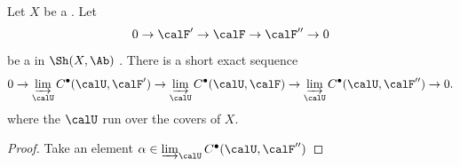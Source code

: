 \begin{lemma}  \label{lemma:short_exact_sequence_of_sheaves_of_abelian_groups_on_a_topological_space_yields_short_exact_sequence_of_colimits_of_cech_complexes}
    Let $X$ be a . Let 
    $$0 \to \calF' \to \calF \to \calF'' \to 0$$
    be a  in $\Sh(X, \Ab)$ . 
    There is a short exact sequence
    $$0 \to \varinjlim_{\calU} C^\bullet(\calU, \calF') \to \varinjlim_{\calU} C^\bullet(\calU, \calF) \to \varinjlim_{\calU} C^\bullet(\calU, \calF'') \to 0.$$
    where the $\calU$ run over the  covers of $X$. 
\end{lemma}
\begin{proof}
    \TODO{}
    Take an element $\alpha \in \varinjlim_{\calU} C^\bullet(\calU, \calF'')$
\end{proof}
